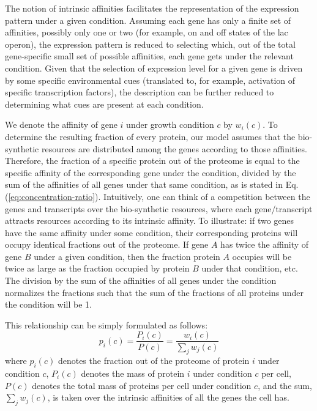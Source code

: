 \documentclass[10pt,letterpaper]{article}
\begin{document}
The notion of intrinsic affinities facilitates the representation of the expression pattern under a given condition.
Assuming each gene has only a finite set of affinities, possibly only one or two (for example, on and off states of the lac operon), the expression pattern is reduced to selecting which, out of the total gene-specific small set of possible affinities, each gene gets under the relevant condition.
Given that the selection of expression level for a given gene is driven by some specific environmental cues (translated to, for example, activation of specific transcription factors), the description can be further reduced to determining what cues are present at each condition.

We denote the affinity of gene $i$ under growth condition $c$ by $w_i(c)$.
To determine the resulting fraction of every protein, our model assumes that the bio-synthetic resources are distributed among the genes according to those affinities.
Therefore, the fraction of a specific protein out of the proteome is equal to the specific affinity of the corresponding gene under the condition, divided by the sum of the affinities of all genes under that same condition, as is stated in Eq.(\ref{eq:concentration-ratio}).
Intuitively, one can think of a competition between the genes and transcripts over the bio-synthetic resources, where each gene/transcript attracts resources according to its intrinsic affinity.
To illustrate: if two genes have the same affinity under some condition, their corresponding proteins will occupy identical fractions out of the proteome.
If gene $A$ has twice the affinity of gene $B$ under a given condition, then the fraction protein  $A$ occupies will be twice as large as the fraction occupied by protein $B$ under that condition, etc.
The division by the sum of the affinities of all genes under the condition normalizes the fractions such that the sum of the fractions of all proteins under the condition will be 1.

This relationship can be simply formulated as follows:
\begin{equation}
  \label{eq:concentration-ratio}
  p_i(c)=\frac{P_i(c)}{P(c)}=\frac{w_i(c)}{\sum_jw_j(c)}
\end{equation}
where $p_i(c)$ denotes the fraction out of the proteome of protein $i$ under condition $c$, $P_i(c)$ denotes the mass of protein $i$ under condition $c$ per cell, $P(c)$ denotes the total mass of proteins per cell under condition $c$, and the sum, $\sum_jw_j(c)$, is taken over the intrinsic affinities of all the genes the cell has.
\end{document}
